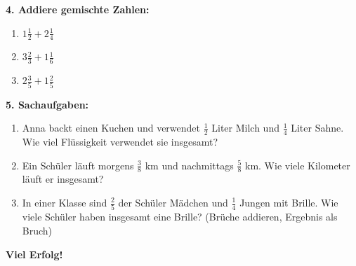 \textbf{4. Addiere gemischte Zahlen:}
\begin{enumerate}[label=\alph*)]
  \item $\displaystyle 1\frac{1}{2} + 2\frac{1}{4}$
  \item $\displaystyle 3\frac{2}{3} + 1\frac{1}{6}$
  \item $\displaystyle 2\frac{3}{5} + 1\frac{2}{5}$
\end{enumerate}
\newpage
\textbf{5. Sachaufgaben:}
\begin{enumerate}[label=\alph*)]
  \item Anna backt einen Kuchen und verwendet $\displaystyle \frac{1}{2}$ Liter Milch und $\displaystyle \frac{1}{4}$ Liter Sahne. Wie viel Flüssigkeit verwendet sie insgesamt?
  \item Ein Schüler läuft morgens $\displaystyle \frac{3}{8}$ km und nachmittags $\displaystyle \frac{5}{8}$ km. Wie viele Kilometer läuft er insgesamt?
  \item In einer Klasse sind $\displaystyle \frac{2}{5}$ der Schüler Mädchen und $\displaystyle \frac{1}{4}$ Jungen mit Brille. Wie viele Schüler haben insgesamt eine Brille? (Brüche addieren, Ergebnis als Bruch)
\end{enumerate}

\textbf{Viel Erfolg!}

